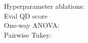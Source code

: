 \documentclass{article}
\begin{document}
    Hyperparameter ablations:\\

    Eval QD score\\
    One-way ANOVA:\\
    
    Pairwise Tukey:\\
    
\end{document}
